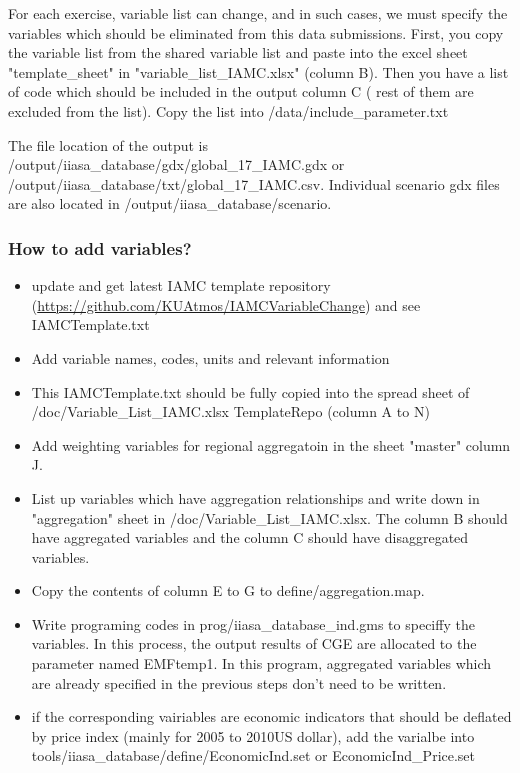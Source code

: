 \documentclass[10pt,a4paper,titlepage,dvipdfmx]{book}
\begin{document}
For each exercise, variable list can change, and in such cases, we must specify the variables which should be eliminated from this data submissions. 
First, you copy the variable list from the shared variable list and paste into the excel sheet "template\_sheet" in "variable\_list\_IAMC.xlsx" (column B). 
Then you have a list of code which should be included in the output column C ( rest of them are excluded from the list). 
Copy the list into /data/include\_parameter.txt

  The file location of the output is /output/iiasa\_database/gdx/global\_17\_IAMC.gdx or /output/iiasa\_database/txt/global\_17\_IAMC.csv.
Individual scenario gdx files are also located in /output/iiasa\_database/scenario.

\subsubsection{\label{subsubsec:HowtoAddVar}How to add variables?}

\begin{itemize}
\item update and get latest IAMC template repository (\url{https://github.com/KUAtmos/IAMCVariableChange}) and see IAMCTemplate.txt
\item Add variable names, codes, units and relevant information
\item	This IAMCTemplate.txt should be fully copied into the spread sheet of /doc/Variable\_List\_IAMC.xlsx TemplateRepo (column A to N)
\item	Add weighting variables for regional aggregatoin in the sheet "master" column J.
\item	List up variables which have aggregation relationships and write down in "aggregation" sheet in /doc/Variable\_List\_IAMC.xlsx. The column B should have aggregated variables and the column C should have disaggregated variables. 
\item	Copy the contents of column E to G to define/aggregation.map.
\item	Write programing codes in prog/iiasa\_database\_ind.gms to speciffy the variables. In this process, the output results of CGE are allocated to the parameter named EMFtemp1. In this program, aggregated variables which are already specified in the previous steps don't need to be written.
\item	if the corresponding vairiables are economic indicators that should be deflated by price index (mainly for 2005 to 2010US dollar), 
add the varialbe into tools/iiasa\_database/define/EconomicInd.set or EconomicInd\_Price.set
\end{itemize}
\end{document}
